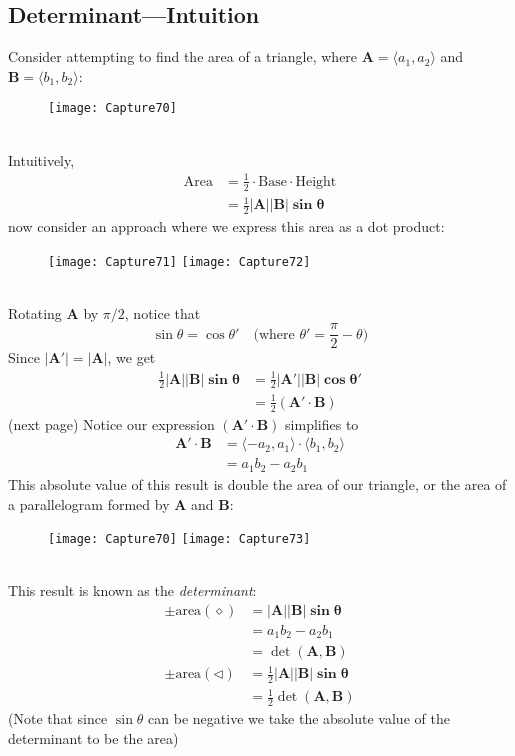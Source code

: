 \documentclass{report}
\begin{document}
\subsection{Determinant---Intuition} %
Consider attempting to find the area of a triangle, where $\mathbf{A}=\langle a_1,a_2\rangle$ and $\mathbf{B}=\langle b_1,b_2\rangle$:
\begin{figure}[h]
\texttt{[image: Capture70]}\\
\centering
\end{figure}\\
Intuitively,
\begin{align*}
\text{Area}&=\frac{1}{2}\cdot\text{Base}\cdot\text{Height}\\
&=\frac{1}{2}\mathbf{|A||B|\sin\theta}
\end{align*}
now consider an approach where we express this area as a dot product:
\begin{figure}[h]
\texttt{[image: Capture71]}
\texttt{[image: Capture72]}\\
\centering
\end{figure}\\
Rotating $\mathbf{A}$ by $\pi/2$, notice that
\begin{equation*}
\sin\theta=\cos\theta'\quad\text{(where $\theta'=\frac{\pi}{2}-\theta$)}
\end{equation*}
Since $\mathbf{|A'|=|A|}$, we get
\begin{align*}
\frac{1}{2}\mathbf{|A||B|\sin\theta}&=\frac{1}{2}\mathbf{|A'||B|\cos\theta'}\\
&=\frac{1}{2}(\mathbf{A'\cdot B})
\end{align*}
(next page)
\newpage
\noindent Notice our expression $(\mathbf{A'\cdot B})$ simplifies to
\begin{align*}
\mathbf{A'\cdot B}
&=\langle -a_2,a_1\rangle\cdot\langle b_1,b_2\rangle\\
&=a_1b_2-a_2b_1
\end{align*}
This absolute value of this result is double the area of our triangle, or the 
area of a parallelogram formed by $\mathbf{A}$ and $\mathbf{B}$:
\begin{figure}[h]
\texttt{[image: Capture70]}
\texttt{[image: Capture73]}\\
\centering
\end{figure}\\
This result is known as the \textit{determinant}:
\begin{align*}
\pm\text{area}(\diamond)&=\mathbf{|A||B|\sin\theta}\\
&=a_1b_2-a_2b_1\\
&=\det(\mathbf{A,B})\\
\pm\text{area}(\triangleleft)&=\frac{1}{2}\mathbf{|A||B|\sin\theta}\\
&=\frac{1}{2}\det(\mathbf{A,B})
\end{align*}
(Note that since $\sin\theta$ can be negative we take the absolute value of the
determinant to be the area)
\newpage
\end{document}
